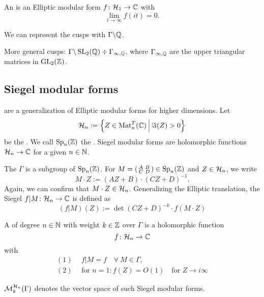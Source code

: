 An  is an Elliptic modular form $f \colon \mathcal{H}_1 \rightarrow \mathbb{C}$ with
\[ \lim_{t \rightarrow \infty} f(i t) = 0 . \]

We can represent the cusps with $\Gamma \backslash \mathbb{Q}$.

More general cusps: $\Gamma \backslash \operatorname{SL}_2(\mathbb{Q}) \div \Gamma_{\infty, \mathbb{Q}}$, where $\Gamma_{\infty, \mathbb{Q}}$ are the upper triangular matrices in $\operatorname{GL}_2(\mathbb{Z})$.


\subsection{Siegel modular forms}

 are a generalization of Elliptic modular forms for higher dimensions.
Let
\[ \SiegelHalfPlane_n := \Set{Z \in \M_n^T(\C)}{\Im(Z) > 0} \]
be the .
We call $\operatorname{Sp}_n(\mathbb{Z})$ the .
Siegel modular forms are holomorphic functions $\mathcal{H}_n \rightarrow \mathbb{C}$ for a given  $n \in \mathbb{N}$.

The  $\Gamma$ is a subgroup of $\operatorname{Sp}_n(\mathbb{Z})$. For $M = \left( \begin{smallmatrix} A & B \\ C & D \end{smallmatrix} \right) \in \operatorname{Sp}_n(\mathbb{Z})$ and $Z \in \mathcal{H}_n$, we write
\[ M \cdot Z := (A Z + B) \cdot (C Z + D)^{-1} . \]
Again, we can confirm that $M\cdot Z \in \mathcal{H}_n$.
Generalizing the Elliptic translation, the Siegel  $f | M \colon \mathcal{H}_n \rightarrow \mathbb{C}$ is defined as   
\[ ( f | M ) (Z) :=
\det(CZ + D)^{-k} \cdot f(M \cdot Z) \]



A  of degree $n\in\mathbb{N}$ with weight $k \in \mathbb{Z}$ over $\Gamma$ is a holomorphic function
\[ f \colon \mathcal{H}_n \rightarrow \mathbb{C} \]
with
\begin{align*}
(1) \ \ & f|M = f \quad \forall \ M \in \Gamma, \\
(2) \ \ & \text{for } n = 1 \colon f(Z) = O(1) \quad \text{for } Z \rightarrow i \infty
\end{align*}

$\operatorname{\mathcal{M}}^{\mathcal{H}_{n}}_k (\Gamma)$ denotes the vector space of such Siegel modular forms.

